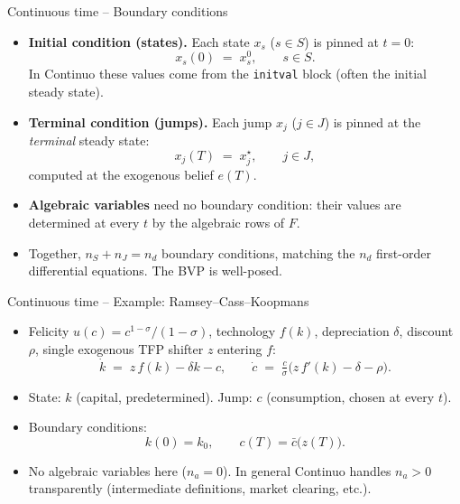\documentclass[11pt,aspectratio=169]{beamer}
\begin{document}
\begin{frame}{Continuous time -- Boundary conditions}

\begin{itemize}

\item \textbf{Initial condition (states).} Each state $x_s$ ($s\in S$)
  is pinned at $t=0$:
  \[
  x_s(0) \;=\; x_s^{0},
  \qquad s\in S.
  \]
  In Continuo these values come from the \texttt{initval}
  block (often the initial steady state).\newline

\item \textbf{Terminal condition (jumps).} Each jump $x_j$ ($j\in J$)
  is pinned at the \emph{terminal} steady state:
  \[
  x_j(T) \;=\; x_j^{\star},
  \qquad j\in J,
  \]
  computed at the exogenous belief $e(T)$.\newline

\item \textbf{Algebraic variables} need no boundary condition: their
  values are determined at every $t$ by the algebraic rows of $F$.\newline

\item Together, $n_S + n_J = n_d$ boundary conditions, matching the
  $n_d$ first-order differential equations. The BVP is well-posed.

\end{itemize}

\end{frame}

\begin{frame}{Continuous time -- Example: Ramsey--Cass--Koopmans}

\begin{itemize}

\item Felicity $u(c)=c^{1-\sigma}/(1-\sigma)$, technology $f(k)$,
  depreciation $\delta$, discount $\rho$, single exogenous TFP shifter
  $z$ entering $f$:
  \[
  \dot k \;=\; z\,f(k) - \delta k - c,
  \qquad
  \dot c \;=\; \tfrac{c}{\sigma}\bigl(z\,f'(k) - \delta - \rho\bigr).
  \]

\item State: $k$ (capital, predetermined). Jump: $c$
  (consumption, chosen at every $t$).\newline

\item Boundary conditions:
  \[
  k(0) = k_0,
  \qquad
  c(T) = \bar c\bigl(z(T)\bigr).
  \]

\item No algebraic variables here ($n_a=0$). In general Continuo
  handles $n_a>0$ transparently (intermediate definitions, market
  clearing, etc.).

\end{itemize}

\end{frame}
\end{document}
